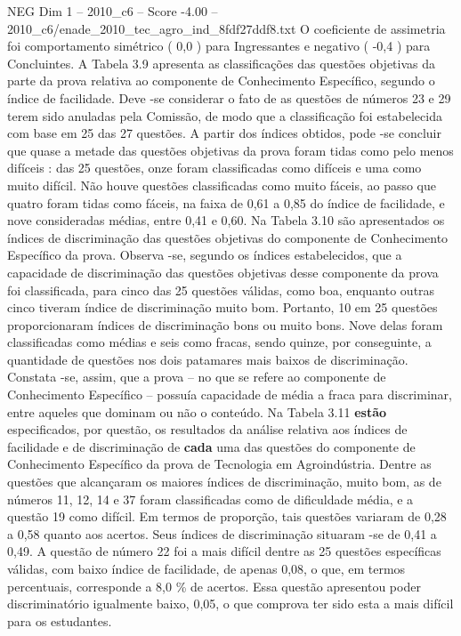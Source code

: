 \begin{textsample}{NEG Dim 1 – 2010\_c6 – Score -4.00 – 2010\_c6/enade\_2010\_tec\_agro\_ind\_8fdf27ddf8.txt}
O coeficiente de assimetria foi comportamento simétrico ( 0,0 ) para Ingressantes e negativo ( -0,4 ) para Concluintes.
A Tabela 3.9 apresenta as classificações das questões objetivas da parte da prova relativa ao componente de Conhecimento Específico, segundo o índice de facilidade.
Deve -se considerar o fato de as questões de números 23 e 29 terem sido anuladas pela Comissão, de modo que a classificação foi estabelecida com base em 25 das 27 questões.
A partir dos índices obtidos, pode -se concluir que quase a metade das questões objetivas da prova foram tidas como pelo menos difíceis : das 25 questões, onze foram classificadas como difíceis e uma como muito difícil.
Não houve questões classificadas como muito fáceis, ao passo que quatro foram tidas como fáceis, na faixa de 0,61 a 0,85 do índice de facilidade, e nove consideradas médias, entre 0,41 e 0,60.
Na Tabela 3.10 são apresentados os índices de discriminação das questões objetivas do componente de Conhecimento Específico da prova.
Observa -se, segundo os índices estabelecidos, que a capacidade de discriminação das questões objetivas desse componente da prova foi classificada, para cinco das 25 questões válidas, como boa, enquanto outras cinco tiveram índice de discriminação muito bom.
Portanto, 10 em 25 questões proporcionaram índices de discriminação bons ou muito bons.
Nove delas foram classificadas como médias e seis como fracas, sendo quinze, por conseguinte, a quantidade de questões nos dois patamares mais baixos de discriminação.
Constata -se, assim, que a prova – no que se refere ao componente de Conhecimento Específico – possuía capacidade de média a fraca para discriminar, entre aqueles que dominam ou não o conteúdo.
Na Tabela 3.11 \textbf{estão} especificados, por questão, os resultados da análise relativa aos índices de facilidade e de discriminação de \textbf{cada} uma das questões do componente de Conhecimento Específico da prova de Tecnologia em Agroindústria.
Dentre as questões que alcançaram os maiores índices de discriminação, muito bom, as de números 11, 12, 14 e 37 foram classificadas como de dificuldade média, e a questão 19 como difícil.
Em termos de proporção, tais questões variaram de 0,28 a 0,58 quanto aos acertos.
Seus índices de discriminação situaram -se de 0,41 a 0,49.
A questão de número 22 foi a mais difícil dentre as 25 questões específicas válidas, com baixo índice de facilidade, de apenas 0,08, o que, em termos percentuais, corresponde a 8,0 \% de acertos.
Essa questão apresentou poder discriminatório igualmente baixo, 0,05, o que comprova ter sido esta a mais difícil para os estudantes.

\end{textsample}
